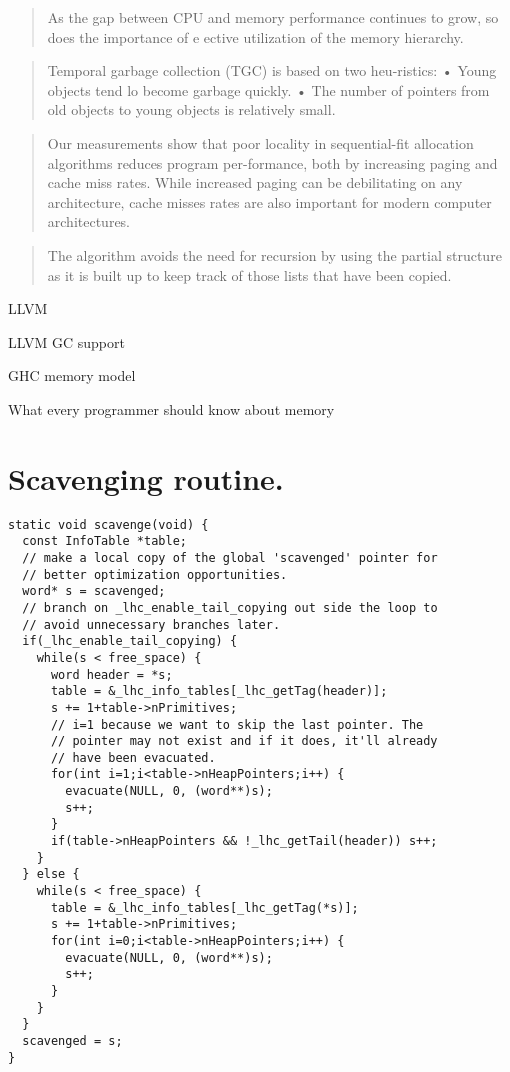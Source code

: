 \documentclass[a4paper,oneside]{memoir}
\begin{document}
\blockquote{As the gap between CPU and memory performance continues to grow, so
does the importance of e ective utilization of the memory hierarchy.}
\cite{Eiron:1999}

\blockquote{Temporal garbage collection (TGC) is based on two heu-ristics:
• Young objects tend lo become garbage quickly.
• The number of pointers from old objects to young objects is relatively small.}
\cite{Courts:1988}

\blockquote{Our measurements show that poor locality in sequential-fit
allocation algorithms reduces program per-formance, both by increasing paging
and cache miss rates. While increased paging can be debilitating on any
architecture, cache misses rates are also important for modern computer
architectures. \cite{Grunwald:1993}}

\blockquote{The algorithm avoids the need for recursion by using the partial
structure as it is built up to keep track of those lists that have been copied.}
\cite{Cheney:1970}

LLVM\cite{LLVM}

LLVM GC support\cite{LLVMGC}

GHC memory model \cite{GHCCommentary}

What every programmer should know about memory \cite{Drepper}




\appendix

\chapter{Scavenging routine.}
\label{scavenge_code}

\begin{lstlisting}
static void scavenge(void) {
  const InfoTable *table;
  // make a local copy of the global 'scavenged' pointer for
  // better optimization opportunities.
  word* s = scavenged;
  // branch on _lhc_enable_tail_copying out side the loop to
  // avoid unnecessary branches later.
  if(_lhc_enable_tail_copying) {
    while(s < free_space) {
      word header = *s;
      table = &_lhc_info_tables[_lhc_getTag(header)];
      s += 1+table->nPrimitives;
      // i=1 because we want to skip the last pointer. The
      // pointer may not exist and if it does, it'll already
      // have been evacuated.
      for(int i=1;i<table->nHeapPointers;i++) {
        evacuate(NULL, 0, (word**)s);
        s++;
      }
      if(table->nHeapPointers && !_lhc_getTail(header)) s++;
    }
  } else {
    while(s < free_space) {
      table = &_lhc_info_tables[_lhc_getTag(*s)];
      s += 1+table->nPrimitives;
      for(int i=0;i<table->nHeapPointers;i++) {
        evacuate(NULL, 0, (word**)s);
        s++;
      }
    }
  }
  scavenged = s;
}
\end{lstlisting}
\end{document}
